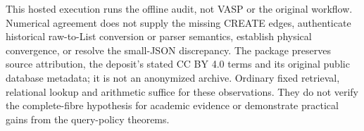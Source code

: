 \documentclass[pdflatex,sn-mathphys-num]{sn-jnl}
\theoremstyle{thmstyleone}
\theoremstyle{thmstylethree}
\theoremstyle{thmstyletwo}
\begin{document}
This hosted execution runs the offline audit, not VASP or the original workflow. Numerical agreement does not supply the missing CREATE edges, authenticate historical raw-to-List conversion or parser semantics, establish physical convergence, or resolve the small-JSON discrepancy. The package preserves source attribution, the deposit's stated CC BY 4.0 terms and its original public database metadata; it is not an anonymized archive. Ordinary fixed retrieval, relational lookup and arithmetic suffice for these observations. They do not verify the complete-fibre hypothesis for academic evidence or demonstrate practical gains from the query-policy theorems.
\end{document}
